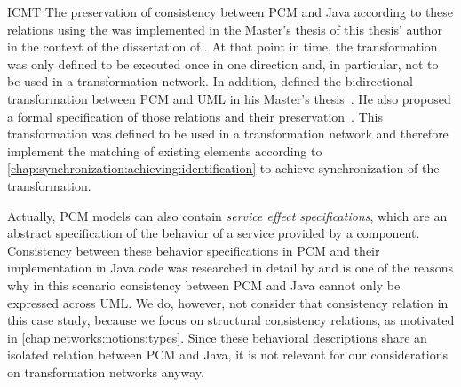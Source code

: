 \begin{copiedFrom}{ICMT}
The preservation of consistency between \gls{PCM} and Java according to these relations using the \reactionslanguage was implemented in the Master's thesis of this thesis' author~\cite{klare2016b} in the context of the dissertation of \textcite{langhammer2017a}.
At that point in time, the transformation was only defined to be executed once in one direction and, in particular, not to be used in a transformation network.
In addition, \citeauthor{syma2018ma} defined the bidirectional transformation between \gls{PCM} and \gls{UML} in his Master's thesis~\cite{syma2018a}.
He also proposed a formal specification of those relations and their preservation~\cite[Section 5]{syma2018ma}.
This transformation was defined to be used in a transformation network and therefore implement the matching of existing elements according to \autoref{chap:synchronization:achieving:identification} to achieve synchronization of the transformation.

Actually, \gls{PCM} models can also contain \emph{service effect specifications}, which are an abstract specification of the behavior of a service provided by a component.
Consistency between these behavior specifications in \gls{PCM} and their implementation in Java code was researched in detail by \textcite{langhammer2017a} and is one of the reasons why in this scenario consistency between \gls{PCM} and Java cannot only be expressed across \gls{UML}.
We do, however, not consider that consistency relation in this case study, because we focus on structural consistency relations, as motivated in \autoref{chap:networks:notions:types}.
Since these behavioral descriptions share an isolated relation between \gls{PCM} and Java, it is not relevant for our considerations on transformation networks anyway.


\end{copiedFrom}
